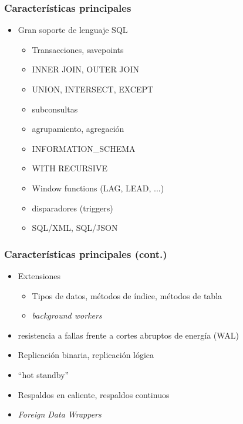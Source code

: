 \begin{frame}
 \frametitle{Características principales}

\begin{itemize}
\item Gran soporte de lenguaje SQL
\begin{itemize}
\item   Transacciones, savepoints
\item   INNER JOIN, OUTER JOIN
\item   UNION, INTERSECT, EXCEPT
\item   subconsultas
\item   agrupamiento, agregación
\item   INFORMATION\_SCHEMA
\item   WITH RECURSIVE
\item   Window functions (LAG, LEAD, ...)
\item   disparadores (triggers)
\item   SQL/XML, SQL/JSON
\end{itemize}
\end{itemize}
\end{frame}

\begin{frame}
  \frametitle{Características principales (cont.)}

  \begin{itemize}
    \item Extensiones
      \begin{itemize}
	\item Tipos de datos, métodos de índice, métodos de tabla
	\item \textit{background workers}
      \end{itemize}
    \item   resistencia a fallas frente a cortes abruptos de energía (WAL)
    \item   Replicación binaria, replicación lógica
    \item   ``hot standby''
    \item   Respaldos en caliente, respaldos continuos
    \item \textit{Foreign Data Wrappers}
  \end{itemize}

\end{frame}

